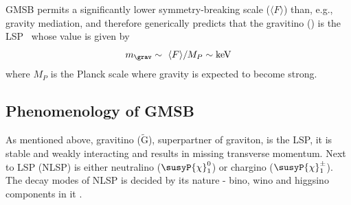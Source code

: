 GMSB permits a significantly lower symmetry-breaking scale ($\langle F\rangle$) than, e.g., gravity mediation, and therefore generically predicts that the gravitino (\grav) is the LSP~\cite{Meade:2008wd,PhysRevLett.38.1433,CREMMER1978231} whose value is given by
\begin{equation}
\label{massGrav}
m_{\grav}  \sim \ \langle F \rangle/M_P \sim \mathrm{keV}
\end{equation}
where $M_P$ is the Planck scale where gravity is expected to become strong.

\subsection{Phenomenology of GMSB}
As mentioned above, gravitino ($\tilde{\mathrm{G}}$), superpartner of graviton, is the LSP, it is stable and weakly interacting and results in missing transverse momentum. Next to LSP (NLSP) is either neutralino ($\susyP{\chi}_{1}^{0}$) or chargino ($\susyP{\chi}_{1}^{\pm}$). The decay modes of NLSP is decided by its nature - bino, wino and higgsino components in it \cite{Knapen:2016exe}.
